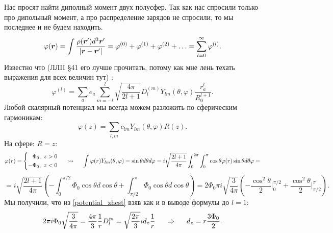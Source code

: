 

Нас просят найти диполный момент двух полусфер.
Так как нас спросили только про дипольный момент, а про распределение зарядов не спросили, то мы последнее и не будем находить.
\begin{equation*}
    \varphi(\mbox{\boldmath $r$}) = \int \frac{\rho(\mbox{\boldmath $r$}') d^3 \mbox{\boldmath $r$}'}{|\mbox{\boldmath $r$} - \mbox{\boldmath $r$}'|}
     = \varphi^{(0)} + \varphi^{(1)} + \varphi^{(2)} + \ldots = \sum_{l=0}^\infty \varphi^{(l)}.
\end{equation*}
Известно что (ЛЛII \S 41 его лучше прочитать, потому как мне лень техать выражения для всех величин тут) :
\begin{equation}
    \varphi^{(l)} = \sum_a e_a\sum_{m = -l}^l \sqrt{\frac{4 \pi}{2 l +1}} D_l^{(m)} Y_{l m} (\theta, \varphi) \frac{r_a^l}{R_0^{l+1}}.
    \label{potential_zhest}
\end{equation}
Любой скалярный потенциал мы всегда можем разложить по сферическим гармоникам:
\begin{equation*}
    \varphi(z) = \sum_{l,m} c_{lm} Y_{lm}(\theta,\varphi) R(z).
\end{equation*}
На сфере: $R=z$:
\begin{equation*}
 \varphi(r) =
    \left\{
    \begin{aligned}
        \Phi_0, \ z>0 \\
        -\Phi_0, \ z<0
    \end{aligned}
    \right.
    \hspace{0.5 cm}
    \leadsto
    \hspace{0.5 cm}
    \int \varphi(r) Y_{l m} (\theta, \varphi) = \sin \theta d \theta d\varphi
    =
    i \sqrt{\frac{2 l +1}{4 \pi}} \int_0^{2\pi} \int_0^\pi \cos \theta \varphi(r) \sin \theta d \theta \varphi =
\end{equation*}
\begin{equation*}
    = i \sqrt{\frac{2 l +1}{4 \pi}} \left(
    -\int_0^{\pi/2} \Phi_0 \cos \theta d \cos \theta + \int_{\pi/2}^\pi \Phi_0 \cos \theta d \cos \theta
    \right)
    =
    2 \Phi_0 \pi i \sqrt{\frac{3}{4 \pi}}\left(
    - \frac{\cos ^2 \theta}{2}\bigg|_0^{\pi/2} + \frac{\cos^2 \theta}{2}\bigg|_{\pi/2}^\pi 
    \right).
\end{equation*}
Мы получили, что из \eqref{potential_zhest} взяв как и в выводе формулы до $l=1$:
\begin{equation*}
    2 \pi i \Phi_0 \sqrt{\frac{3}{4\pi}} = \frac{4 \pi}{3} \frac{1}{r} D_l^m = \sqrt{\frac{2 \pi}{3}} i d_z \frac{1}{r}
    \hspace{0.5 cm}
    \Rightarrow
    \hspace{0.5 cm}
    d_z = r \frac{3 \Phi_0}{2}.
\end{equation*}

